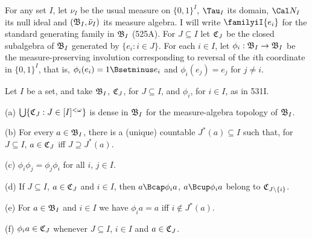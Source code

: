    For
any set $I$, let $\nu_I$ be the usual measure on
$\{0,1\}^I$, $\Tau_I$ its domain, $\Cal N_I$ its
null ideal and $(\frak B_I,\bar\nu_I)$ its measure
algebra.    I will write
$\familyiI{e_i}$ for the standard generating family in $\frak B_I$
(525A).
For $J\subseteq I$ let $\frak C_J$ be the closed subalgebra of
$\frak B_I$ generated by $\{e_i:i\in J\}$.
For each $i\in I$, let
$\phi_i:\frak B_I\to\frak B_I$ be the
measure-preserving involution corresponding to reversal of the $i$th
coordinate in $\{0,1\}^I$, that is,
$\phi_i(e_i)=1\Bsetminus e_i$ and
$\phi_i(e_j)=e_j$ for $j\ne i$.

 Let $I$ be a set, and take
$\frak B_I$, $\frak C_J$, for $J\subseteq I$, and
$\phi_i$, for $i\in I$, as in 531I.

(a) $\bigcup\{\frak C_J:J\in[I]^{<\omega}\}$ is dense in
$\frak B_I$ for the measure-algebra topology of
$\frak B_I$.

(b) For every $a\in\frak B_I$, there is a (unique) countable
$J^*(a)\subseteq I$ such that, for $J\subseteq I$,
$a\in\frak C_J$ iff $J\supseteq J^*(a)$.

(c) $\phi_i\phi_j=\phi_j\phi_i$ for all $i$, $j\in I$.

(d) If $J\subseteq I$, $a\in\frak C_J$ and $i\in I$, then
$a\Bcap\phi_ia$, $a\Bcup\phi_ia$ belong to $\frak C_{J\setminus\{i\}}$.

(e) For $a\in\frak B_I$ and $i\in I$ we have $\phi_ia=a$
iff $i\notin J^*(a)$.

(f) $\phi_ia\in\frak C_J$ whenever $J\subseteq I$, $i\in I$
and $a\in\frak C_J$.

